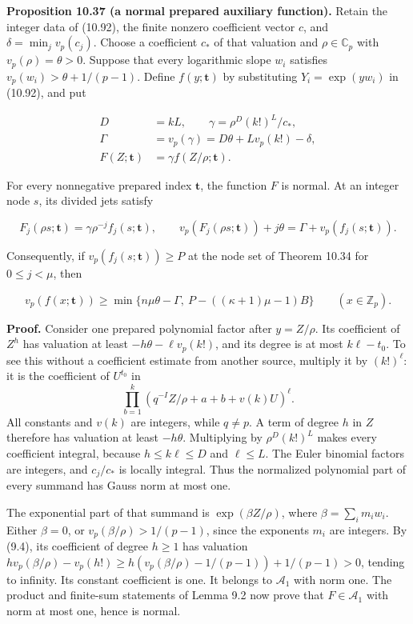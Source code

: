 \documentclass[
  11pt,
  a4paper,
]{article}
\begin{document}
\textbf{Proposition 10.37 (a normal prepared auxiliary function).}
Retain the integer data of (10.92), the finite nonzero coefficient
vector \(c\), and \(\delta=\min_j v_p(c_j)\). Choose a coefficient
\(c_*\) of that valuation and \(\rho\in\mathbb C_p\) with
\(v_p(\rho)=\theta>0\). Suppose that every logarithmic slope \(w_i\)
satisfies \(v_p(w_i)>\theta+1/(p-1)\). Define \(f(y;\boldsymbol t)\) by
substituting \(Y_i=\exp(yw_i)\) in (10.92), and put

\[
\begin{aligned}
D&=kL,\qquad \gamma=\rho^D(k!)^L/c_*,\\
\Gamma&=v_p(\gamma)=D\theta+L v_p(k!)-\delta,\\
F(Z;\boldsymbol t)&=\gamma f(Z/\rho;\boldsymbol t).
\end{aligned}
\tag{10.106}
\]

For every nonnegative prepared index \(\boldsymbol t\), the function
\(F\) is normal. At an integer node \(s\), its divided jets satisfy

\[
F_j(\rho s;\boldsymbol t)=\gamma\rho^{-j}f_j(s;\boldsymbol t),\qquad
v_p(F_j(\rho s;\boldsymbol t))+j\theta=\Gamma+v_p(f_j(s;\boldsymbol t)).
\tag{10.107}
\]

Consequently, if \(v_p(f_j(s;\boldsymbol t))\ge P\) at the node set of
Theorem 10.34 for \(0\le j<\mu\), then

\[
v_p(f(x;\boldsymbol t))\ge
\min\{n\mu\theta-\Gamma,\ P-((\kappa+1)\mu-1)B\}
\qquad(x\in\mathbb Z_p).
\tag{10.108}
\]

\textbf{Proof.} Consider one prepared polynomial factor after
\(y=Z/\rho\). Its coefficient of \(Z^h\) has valuation at least
\(-h\theta-\ell v_p(k!)\), and its degree is at most \(k\ell-t_0\). To
see this without a coefficient estimate from another source, multiply it
by \((k!)^\ell\): it is the coefficient of \(U^{t_0}\) in \[
\prod_{b=1}^k(q^{-I}Z/\rho+a+b+v(k)U)^\ell.
\] All constants and \(v(k)\) are integers, while \(q\ne p\). A term of
degree \(h\) in \(Z\) therefore has valuation at least \(-h\theta\).
Multiplying by \(\rho^D(k!)^L\) makes every coefficient integral,
because \(h\le k\ell\le D\) and \(\ell\le L\). The Euler binomial
factors are integers, and \(c_j/c_*\) is locally integral. Thus the
normalized polynomial part of every summand has Gauss norm at most one.

The exponential part of that summand is \(\exp(\beta Z/\rho)\), where
\(\beta=\sum_i m_iw_i\). Either \(\beta=0\), or
\(v_p(\beta/\rho)>1/(p-1)\), since the exponents \(m_i\) are integers.
By (9.4), its coefficient of degree \(h\ge1\) has valuation
\(h v_p(\beta/\rho)-v_p(h!)\ge h(v_p(\beta/\rho)-1/(p-1))+1/(p-1)>0\),
tending to infinity. Its constant coefficient is one. It belongs to
\(\mathcal A_1\) with norm one. The product and finite-sum statements of
Lemma 9.2 now prove that \(F\in\mathcal A_1\) with norm at most one,
hence is normal.
\end{document}
